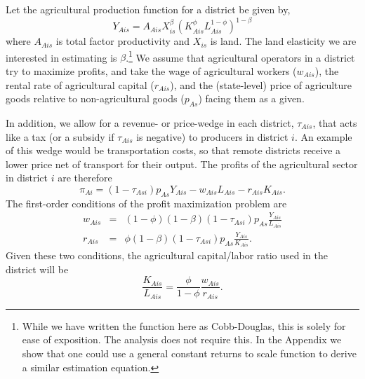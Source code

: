 \documentclass[12pt]{article}
\begin{document}
Let the agricultural production function for a district be given by,
\begin{equation}
Y_{Ais} = A_{Ais} X_{is}^{\beta} \left(K_{Ais}^{\phi}L_{Ais}^{1-\phi}\right)^{1-\beta} \label{EQ_production}
\end{equation}
where $A_{Ais}$ is total factor productivity and $X_{is}$ is land. The land elasticity we are interested in estimating is $\beta$.\footnote{While we have written the function here as Cobb-Douglas, this is solely for ease of exposition. The analysis does not require this. In the Appendix we show that one could use a general constant returns to scale function to derive a similar estimation equation.} We assume that agricultural operators in a district try to maximize profits, and take the wage of agricultural workers ($w_{Ais}$), the rental rate of agricultural capital ($r_{Ais}$), and the (state-level) price of agriculture goods relative to non-agricultural goods ($p_{As}$) facing them as a given.

In addition, we allow for a revenue- or price-wedge in each district, $\tau_{Ais}$, that acts like a tax (or a subsidy if $\tau_{Ais}$ is negative) to producers in district $i$. An example of this wedge would be transportation costs, so that remote districts receive a lower price net of transport for their output. The profits of the agricultural sector in district $i$ are therefore
\begin{equation}
	\pi_{Ai} = (1-\tau_{Asi}) p_{As} Y_{Ais} - w_{Ais} L_{Ais} - r_{Ais} K_{Ais}.
\end{equation}
The first-order conditions of the profit maximization problem are
\begin{eqnarray}
    w_{Ais} &=& (1-\phi)(1-\beta) (1-\tau_{Asi}) p_{As} \frac{Y_{Ais}}{L_{Ais}} \\ \nonumber 
    r_{Ais} &=& \phi(1-\beta) (1-\tau_{Asi}) p_{As} \frac{Y_{Ais}}{K_{Ais}}. \label{EQ_factorprices}
\end{eqnarray}
Given these two conditions, the agricultural capital/labor ratio used in the district will be
\begin{equation}
	\frac{K_{Ais}}{L_{Ais}} = \frac{\phi}{1-\phi} \frac{w_{Ais}}{r_{Ais}}. \label{EQ_KLag}
\end{equation}
\end{document}
